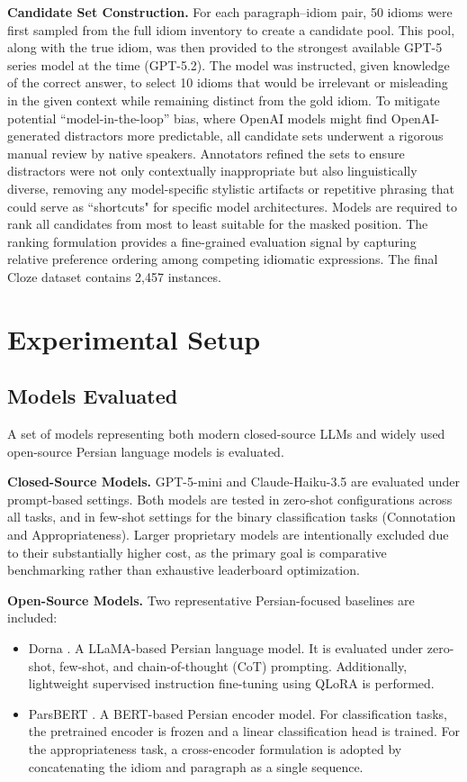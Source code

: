 \documentclass[11pt,a4paper]{article}
\begin{document}
\textbf{Candidate Set Construction.}
For each paragraph–idiom pair, 50 idioms were first sampled from the full idiom inventory to create a candidate pool. This pool, along with the true idiom, was then provided to the strongest available GPT-5 series model at the time (GPT-5.2). The model was instructed, given knowledge of the correct answer, to select 10 idioms that would be irrelevant or misleading in the given context while remaining distinct from the gold idiom. To mitigate potential ``model-in-the-loop'' bias, where OpenAI models might find OpenAI-generated distractors more predictable, all candidate sets underwent a rigorous manual review by native speakers. Annotators refined the sets to ensure distractors were not only contextually inappropriate but also linguistically diverse, removing any model-specific stylistic artifacts or repetitive phrasing that could serve as ``shortcuts" for specific model architectures. Models are required to rank all candidates from most to least suitable for the masked position. The ranking formulation provides a fine-grained evaluation signal by capturing relative preference ordering among competing idiomatic expressions. The final Cloze dataset contains 2,457 instances.

\section{Experimental Setup}

\subsection{Models Evaluated}
A set of models representing both modern closed-source LLMs and widely used open-source Persian language models is evaluated.

\textbf{Closed-Source Models.}
GPT-5-mini and Claude-Haiku-3.5 are evaluated under prompt-based settings. Both models are tested in zero-shot configurations across all tasks, and in few-shot settings for the binary classification tasks (Connotation and Appropriateness). Larger proprietary models are intentionally excluded due to their substantially higher cost, as the primary goal is comparative benchmarking rather than exhaustive leaderboard optimization.

\textbf{Open-Source Models.}
Two representative Persian-focused baselines are included:

\begin{itemize}
    \item Dorna \cite{dorna_llama3}. A LLaMA-based Persian language model. It is evaluated under zero-shot, few-shot, and chain-of-thought (CoT) prompting. Additionally, lightweight supervised instruction fine-tuning using QLoRA \cite{dettmers2023qlora} is performed.
    \item ParsBERT \cite{farahani2021parsbert}. A BERT-based Persian encoder model. For classification tasks, the pretrained encoder is frozen and a linear classification head is trained. For the appropriateness task, a cross-encoder formulation is adopted by concatenating the idiom and paragraph as a single sequence.
\end{itemize}
\end{document}
